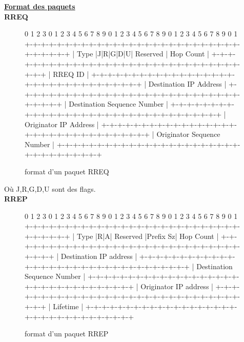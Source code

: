 \documentclass[a4paper, 12pt]{report}
\begin{document}
        
        \underline{\textbf{Format des paquets}}\\
        
        
        \textbf{RREQ}
        \begin{figure}[H]
        \centering
            \begin{verbatimtab}
 0                   1                   2                   3
 0 1 2 3 4 5 6 7 8 9 0 1 2 3 4 5 6 7 8 9 0 1 2 3 4 5 6 7 8 9 0 1
+-+-+-+-+-+-+-+-+-+-+-+-+-+-+-+-+-+-+-+-+-+-+-+-+-+-+-+-+-+-+-+-+
|     Type      |J|R|G|D|U|   Reserved          |   Hop Count   |
+-+-+-+-+-+-+-+-+-+-+-+-+-+-+-+-+-+-+-+-+-+-+-+-+-+-+-+-+-+-+-+-+
|                            RREQ ID                            |
+-+-+-+-+-+-+-+-+-+-+-+-+-+-+-+-+-+-+-+-+-+-+-+-+-+-+-+-+-+-+-+-+
|                    Destination IP Address                     |
+-+-+-+-+-+-+-+-+-+-+-+-+-+-+-+-+-+-+-+-+-+-+-+-+-+-+-+-+-+-+-+-+
|                  Destination Sequence Number                  |
+-+-+-+-+-+-+-+-+-+-+-+-+-+-+-+-+-+-+-+-+-+-+-+-+-+-+-+-+-+-+-+-+
|                    Originator IP Address                      |
+-+-+-+-+-+-+-+-+-+-+-+-+-+-+-+-+-+-+-+-+-+-+-+-+-+-+-+-+-+-+-+-+
|                  Originator Sequence Number                   |
+-+-+-+-+-+-+-+-+-+-+-+-+-+-+-+-+-+-+-+-+-+-+-+-+-+-+-+-+-+-+-+-+
            \end{verbatimtab}
        \caption{format d'un paquet RREQ \cite{aodv_w}}
        \label{rreqPaquet}
    \end{figure}

    Où J,R,G,D,U sont des flags.\\
        
        \textbf{RREP}
        \begin{figure}[H]
            \centering
                \begin{verbatimtab}
 0                   1                   2                   3
 0 1 2 3 4 5 6 7 8 9 0 1 2 3 4 5 6 7 8 9 0 1 2 3 4 5 6 7 8 9 0 1
+-+-+-+-+-+-+-+-+-+-+-+-+-+-+-+-+-+-+-+-+-+-+-+-+-+-+-+-+-+-+-+-+
|     Type      |R|A|    Reserved     |Prefix Sz|   Hop Count   |
+-+-+-+-+-+-+-+-+-+-+-+-+-+-+-+-+-+-+-+-+-+-+-+-+-+-+-+-+-+-+-+-+
|                     Destination IP address                    |
+-+-+-+-+-+-+-+-+-+-+-+-+-+-+-+-+-+-+-+-+-+-+-+-+-+-+-+-+-+-+-+-+
|                  Destination Sequence Number                  |
+-+-+-+-+-+-+-+-+-+-+-+-+-+-+-+-+-+-+-+-+-+-+-+-+-+-+-+-+-+-+-+-+
|                    Originator IP address                      |
+-+-+-+-+-+-+-+-+-+-+-+-+-+-+-+-+-+-+-+-+-+-+-+-+-+-+-+-+-+-+-+-+
|                           Lifetime                            |
+-+-+-+-+-+-+-+-+-+-+-+-+-+-+-+-+-+-+-+-+-+-+-+-+-+-+-+-+-+-+-+-+
                \end{verbatimtab}
            \caption{format d'un paquet RREP \cite{aodv_w}}
            \label{rreqPaquet}
        \end{figure}
\end{document}
